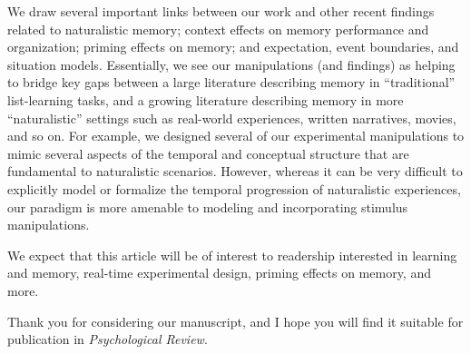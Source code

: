 \documentclass[11pt,stdletter,orderfromtodate,sigleft]{newlfm}
\newcommand{\journal}{Psychological Review}
\begin{document}
\begin{newlfm}
  We draw several important links between our work and other recent findings
  related to naturalistic memory; context effects on memory performance and
  organization; priming effects on memory; and expectation, event boundaries,
  and situation models. Essentially, we see our manipulations (and findings) as
  helping to bridge key gaps between a large literature describing memory in
  ``traditional'' list-learning tasks, and a growing literature describing
  memory in more ``naturalistic'' settings such as real-world experiences,
  written narratives, movies, and so on. For example, we designed several of
  our experimental manipulations to mimic several aspects of the temporal and
  conceptual structure that are fundamental to naturalistic scenarios. However,
  whereas it can be very difficult to explicitly model or formalize the
  temporal progression of naturalistic experiences, our paradigm is more
  amenable to modeling and incorporating stimulus manipulations.

  We expect that this article will be of interest to readership interested in
  learning and memory, real-time experimental design, priming effects on
  memory, and more.

Thank you for considering our manuscript, and I hope you will find it suitable
for publication in \textit{\journal}.


\end{newlfm}
\end{document}
